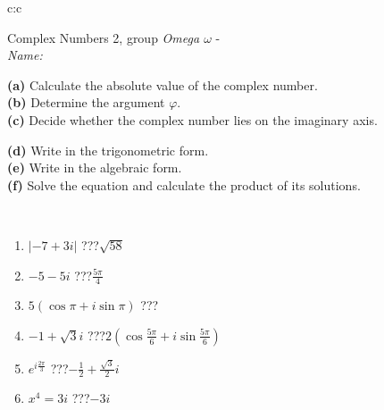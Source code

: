 \documentclass[10pt]{report}
\begin{document}
\newpage
\thispagestyle{empty}
\begin{tabular}{c:c}
\begin{minipage}[c][104.5mm][t]{0.5\linewidth}
\begin{center}
\vspace{5mm}
{\huge Complex Numbers 2, group \textit{Omega $\omega$} -}\\[5mm]
\textit{Name:}\phantom{xxxxxxxxxxxxxxxxxxxxxxxxxxxxxxxxxxxxxxxxxxxxxxxxxxxxxxxxxxxxxxxxx}\\[5mm]
\begin{minipage}{0.95\linewidth}
\begin{center}
{\small \begin{minipage}{0.44\textwidth} \raggedright
\textbf{(a)} Calculate the absolute value of the complex number. \\[1mm]
\textbf{(b)} Determine the argument \(\varphi\). \\[1mm]
\textbf{(c)} Decide whether the complex number lies on the imaginary axis. \end{minipage} \begin{minipage}{0.54\textwidth}
\textbf{(d)} Write in the trigonometric form. \\[1mm]
\textbf{(e)} Write in the algebraic form. \\[1mm]
\textbf{(f)} Solve the equation and calculate the product of its solutions.
\end{minipage}
}
\end{center}
\end{minipage}
\\[1mm]
\begin{minipage}{0.79\linewidth}
\begin{center}
\begin{varwidth}{\linewidth}
\setlength{\itemsep}{0pt}
\begin{enumerate}
\large
\item $|-7+3i|$\quad \dotfill\; ???\;\dotfill \quad $\sqrt{58}$
\item $-5-5i$\quad \dotfill\; ???\;\dotfill \quad $\frac{5\pi}{4}$
\item $5\left(\cos{\pi}+i\sin{\pi}\right)$\quad \dotfill\; ???\;\dotfill \quad {}
\item $-1+\sqrt{3}i$\quad \dotfill\; ???\;\dotfill \quad $2\left(\cos{\frac{5\pi}{6}}+i\sin{\frac{5\pi}{6}}\right)$
\item $e^{i\frac{2\pi}{3}}$\quad \dotfill\; ???\;\dotfill \quad $-\frac{1}{2}+\frac{ \sqrt{3}}{2}i$
\item $x^4=3i$\quad \dotfill\; ???\;\dotfill \quad $-3i$

\end{enumerate}
\end{varwidth}
\end{center}
\end{minipage}
\end{center}
\end{minipage}
\end{tabular}
\end{document}
